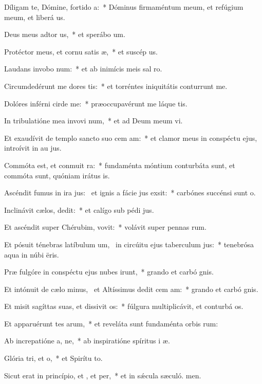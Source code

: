 \item Díligam te, Dómine, fortido a:~* Dóminus firmaméntum meum, et refúgium meum, et liberá us.
\item Deus meus adtor us,~* et sperábo  um.
\item Protéctor meus, et cornu satis æ,~* et suscép us.
\item Laudans invobo num:~* et ab inimícis meis sal ro.
\item Circumdedérunt me dores tis:~* et torréntes iniquitátis conturrunt me.
\item Dolóres inférni cirde me:~* præoccupavérunt me láque tis.
\item In tribulatióne mea invovi num,~* et ad Deum meum vi.
\item Et exaudívit de templo sancto suo cem am:~* et clamor meus in conspéctu ejus, introívit in au jus.
\item Commóta est, et conmuit ra:~* fundaménta móntium conturbáta sunt, et commóta sunt, quóniam irátus  is.
\item Ascéndit fumus in ira jus:~\pscross{} et ignis a fácie jus exsit:~* carbónes succénsi sunt  o.
\item Inclinávit cælos,  dedit:~* et calígo sub pédi jus.
\item Et ascéndit super Chérubim,  vovit:~* volávit super pennas rum.
\item Et pósuit ténebras latíbulum um,~\pscross{} in circúitu ejus taberculum jus:~* tenebrósa aqua in núbi ëris.
\item Præ fulgóre in conspéctu ejus nubes irunt,~* grando et carbó gnis.
\item Et intónuit de cælo minus,~\pscross{} et Altíssimus dedit cem am:~* grando et carbó gnis.
\item Et misit sagíttas suas, et dissivit os:~* fúlgura multiplicávit, et conturbá os.
\item Et apparuérunt tes arum,~* et reveláta sunt fundaménta orbis rum:
\item Ab increpatióne a, ne,~* ab inspiratióne spíritus i æ.
\item Glória tri, et o,~* et Spirítu to.
\item Sicut erat in princípio, et , et per,~* et in sǽcula sæculó. men.
